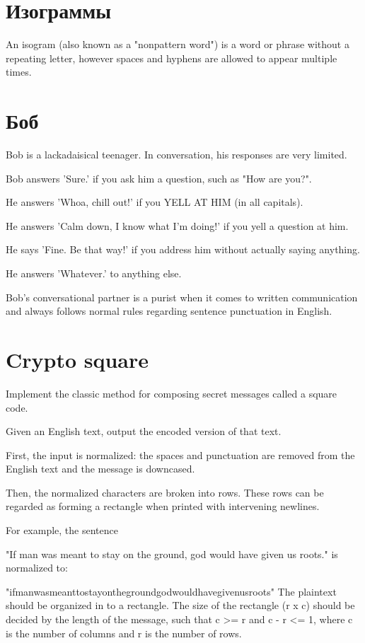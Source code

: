 \documentclass[10pt,twoside,openany]{book}
\begin{document}
\section{Изограммы}

An isogram (also known as a "nonpattern word") is a word or phrase without a repeating letter, however spaces and hyphens are allowed to appear multiple times.

\section{Боб}

Bob is a lackadaisical teenager. In conversation, his responses are very limited.

Bob answers 'Sure.' if you ask him a question, such as "How are you?".

He answers 'Whoa, chill out!' if you YELL AT HIM (in all capitals).

He answers 'Calm down, I know what I'm doing!' if you yell a question at him.

He says 'Fine. Be that way!' if you address him without actually saying anything.

He answers 'Whatever.' to anything else.

Bob's conversational partner is a purist when it comes to written communication and always follows normal rules regarding sentence punctuation in English.

\section{Crypto square}

Implement the classic method for composing secret messages called a square code.

Given an English text, output the encoded version of that text.

First, the input is normalized: the spaces and punctuation are removed from the English text and the message is downcased.

Then, the normalized characters are broken into rows. These rows can be regarded as forming a rectangle when printed with intervening newlines.

For example, the sentence

"If man was meant to stay on the ground, god would have given us roots."
is normalized to:

"ifmanwasmeanttostayonthegroundgodwouldhavegivenusroots"
The plaintext should be organized in to a rectangle. The size of the rectangle (r x c) should be decided by the length of the message, such that c >= r and c - r <= 1, where c is the number of columns and r is the number of rows.
\end{document}

